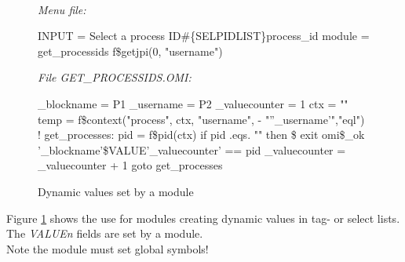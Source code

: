 \documentclass[a4paper]{book}
\renewcommand{\indent}{\hspace*{5mm}}
\begin{document}
\begin{figure}[h!tb]
\begin{minipage}[h!tb]{\textwidth}
\hrulefill \\
\textsl{Menu file:} \newline
\begin{ttfamily}
 \newline
\indent INPUT = Select a process ID{\#}{\{}SEL\textbar PIDLIST{\}}process{\_}id\newline
\noindent[PIDLIST] \newline
\indent module = get{\_}processids  f{\$}getjpi(0, "username") \newline
\end{ttfamily}

\textsl{File GET{\_}PROCESSIDS.OMI:} \newline
\begin{ttfamily}
\noindent{\$} {\_}blockname = P1 \newline
\noindent{\$} {\_}username = P2 \newline
\noindent{\$} {\_}valuecounter = 1 \newline
\noindent{\$} ctx = "" \newline
\noindent{\$} temp = f{\$}context("process", ctx, "username", - \newline
\hspace*{5mm}    "''{\_}username'","eql") \newline
\noindent{\$}! \newline
\noindent{\$}get{\_}processes: \newline
\noindent{\$} pid = f{\$}pid(ctx) \newline
\noindent{\$} if pid .eqs. "" then {\$} exit omi{\$}{\_}ok \newline
\noindent{\$} '{\_}blockname'{\$}VALUE'{\_}valuecounter' == pid \newline
\noindent{\$} {\_}valuecounter = {\_}valuecounter + 1 \newline
\noindent{\$} goto get{\_}processes \newline
\end{ttfamily}
\caption{Dynamic values set by a module}\label{fig:valuesfrommodule}
\hrulefill
\end{minipage}
\end{figure}

Figure \ref{fig:valuesfrommodule} shows the use for modules creating dynamic values in tag- or select lists. The 
\textsl{VALUE\textit{n}} fields are set by a module. \\ 
Note the module must set global symbols! 
\end{document}

